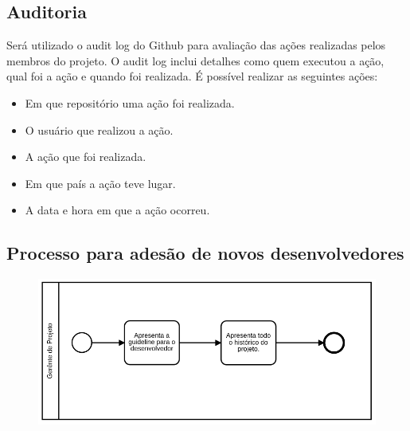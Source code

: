 \documentclass{article}
\begin{document}
		\subsection{Auditoria}
			Será utilizado o audit log do Github para avaliação das ações realizadas pelos membros do projeto. O audit log inclui detalhes como quem executou a ação, qual foi a ação e quando foi realizada.
			\newline
			É possível realizar as seguintes ações:
			\begin{itemize}
				\item Em que repositório uma ação foi realizada.
				\item O usuário que realizou a ação.
				\item A ação que foi realizada.
				\item Em que país a ação teve lugar.
				\item A data e hora em que a ação ocorreu.
			\end{itemize}
        \subsection{Processo para adesão de novos desenvolvedores}
	        \begin{figure}[H]
	        	\centering
	        	\includegraphics[width=0.7\linewidth]{processo_adesao_novo_desenvolvedor}
	        	\caption{}
	        	\label{fig:processoadesaonovodesenvolvedor}
	        \end{figure}
	        
\end{document}
